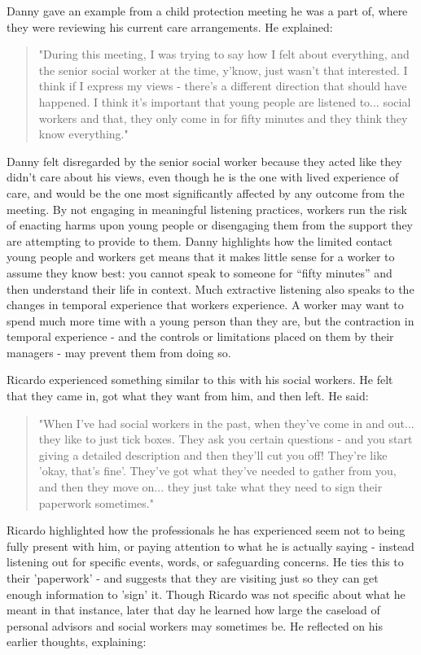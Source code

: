 Danny gave an example from a child protection meeting he was a part of, where they were reviewing his current care arrangements. He explained:
\begin{quote}
"During this meeting, I was trying to say how I felt about everything, and the senior social worker at the time, y'know, just wasn't that interested. I think if I express my views - there's a different direction that should have happened. I think it's important that young people are listened to... social workers and that, they only come in for fifty minutes and they think they know everything."
\end{quote}
Danny felt disregarded by the senior social worker because they acted like they didn't care about his views, even though he is the one with lived experience of care, and would be the one most significantly affected by any outcome from the meeting. By not engaging in meaningful listening practices, workers run the risk of enacting harms upon young people or disengaging them from the support they are attempting to provide to them. Danny highlights how the limited contact young people and workers get means that it makes little sense for a worker to assume they know best: you cannot speak to someone for “fifty minutes” and then understand their life in context. Much extractive listening also speaks to the changes in temporal experience that workers experience. A worker may want to spend much more time with a young person than they are, but the contraction in temporal experience - and the controls or limitations placed on them by their managers - may prevent them from doing so.

Ricardo experienced something similar to this with his social workers. He felt that they came in, got what they want from him, and then left. He said:
\begin{quote}
"When I've had social workers in the past, when they've come in and out... they like to just tick boxes. They ask you certain questions - and you start giving a detailed description and then they'll cut you off! They're like 'okay, that's fine'. They've got what they've needed to gather from you, and then they move on... they just take what they need to sign their paperwork sometimes."
\end{quote}
Ricardo highlighted how the professionals he has experienced seem not to being fully present with him, or paying attention to what he is actually saying - instead listening out for specific events, words, or safeguarding concerns. He ties this to their 'paperwork' - and suggests that they are visiting just so they can get enough information to 'sign' it. Though Ricardo was not specific about what he meant in that instance, later that day he learned how large the caseload of personal advisors and social workers may sometimes be. He reflected on his earlier thoughts, explaining:

